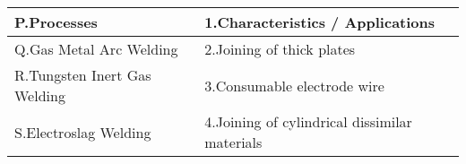 \begin{center}
\begin{tabular}[12pt]{|l|l|}
\hline 
  P.Processes   & 1.Characteristics / Applications \\ \hline
  Q.Gas Metal Arc Welding    & 2.Joining of thick plates \\ \hline
  R.Tungsten Inert Gas Welding &  3.Consumable electrode wire  \\ \hline
  S.Electroslag Welding & 4.Joining of cylindrical dissimilar materials \\ \hline
\end{tabular}
\end{center}